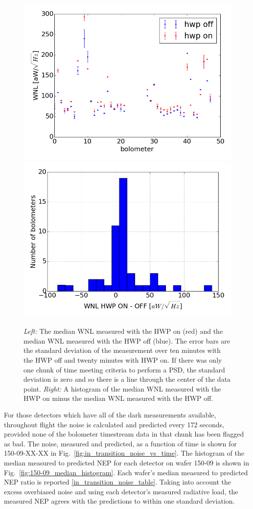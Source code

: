 \begin{figure}[ht!]
\begin{center}
\includegraphics[width=0.4\columnwidth]{figures/hwp_on_and_off_cutoff_at_300aW.png}
\includegraphics[width=0.4\columnwidth]{figures/hwp_on_and_off_median_diff_histogram.png}
\caption{{\it Left:} The median \ac{WNL} measured with the \ac{HWP} on (red) and the median \ac{WNL} measured with the \ac{HWP} off (blue). The error bars are the standard deviation of the measurement over ten minutes with the \ac{HWP} off and twenty minutes with \ac{HWP} on. If there was only one chunk of time meeting criteria to perform a \ac{PSD}, the standard deviation is zero and so there is a line through the center of the data point. {\it Right:} A histogram of the median \ac{WNL} measured with the \ac{HWP} on minus the median \ac{WNL} measured with the \ac{HWP} off.}
\label{fig:hwp_on_vs_off}
\end{center}
\end{figure}



For those detectors which have all of the dark measurements available, throughout flight the noise is calculated and predicted every 172 seconds, provided none of the bolometer timestream data in that chunk has been flagged as bad. 
The noise, measured and predicted, as a function of time is shown for 150-09-XX-XX in Fig.~\ref{fig:in_transition_noise_vs_time}. 
The histogram of the median measured to predicted \ac{NEP} for each detector on wafer 150-09 is shown in Fig.~\ref{fig:150-09_median_histogram}.
Each wafer's median measured to predicted \ac{NEP} ratio is reported \TAB\ref{in_transition_noise_table}. 
Taking into account the excess overbiased noise and using each detector's measured radiative load, the measured \ac{NEP} agrees with the predictions to within one standard deviation. 


